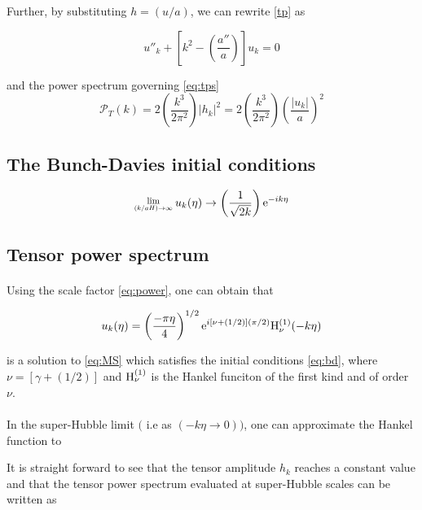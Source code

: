 \documentclass[12pt,a4paper,oneside]{book}
\newcommand{\Lim}[1]{\raisebox{0.5ex}{\scalebox{0.8}{$\displaystyle \lim_{#1}\;$}}}
\begin{document}
Further, by substituting $h = \left(u/a\right)$, we can rewrite \ref{tp} as

\begin{equation}\label{eq:MS}
u''_k + \left[k^2 - \left(\frac{a''}{a}\right)\right]u_k = 0
\end{equation}

\noindent and the power spectrum governing \ref{eq:tps}
\begin{equation}
{\mathcal{P}}_T(k) = 2 \left(\frac{k^3}{2\pi^2}\right) |h_k|^2 = 2 \left(\frac{k^3}{2\pi^2}\right) \left(\frac{|u_k|}{a}\right)^2
\end{equation}

\subsection{The Bunch-Davies initial conditions}

\begin{equation}\label{eq:bd}
\Lim{\left(k/aH\right) \rightarrow \infty} u_k(\eta) \rightarrow \left(\frac{1}{\sqrt{2k}}\right){\rm e}^{-ik\eta}
\end{equation}

\subsection{Tensor power spectrum}

\paragraph*{} Using the scale factor \ref{eq:power}, one can obtain that

\begin{equation}
u_k(\eta) = \left(\frac{-\pi\eta}{4}\right)^{1/2}{\rm e}^{i[\nu+(1/2)](\pi/2)}{\rm H}_{\nu}^{(1)}(-k\eta)
\end{equation}

\noindent is a solution to \ref{eq:MS} which satisfies the initial conditions \ref{eq:bd}, where $\nu = [\gamma + (1/2)]$ and 
${\rm H}_{\nu}^{(1)}$ is the Hankel funciton of the first kind and of order $\nu$.

\paragraph*{} In the super-Hubble limit $($ i.e as $(-k\eta \rightarrow 0))$, one can approximate the Hankel function to

\noindent It is straight forward to see that the tensor amplitude $h_k$ reaches a constant value and that the tensor power spectrum
evaluated at super-Hubble scales can be written as
\end{document}
